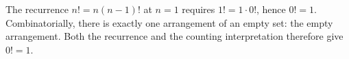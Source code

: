 The recurrence $n!=n(n-1)!$ at $n=1$ requires $1!=1\cdot0!$, hence $0!=1$. Combinatorially, there is exactly one arrangement of an empty set: the empty arrangement. Both the recurrence and the counting interpretation therefore give $\boxed{0!=1}$.
